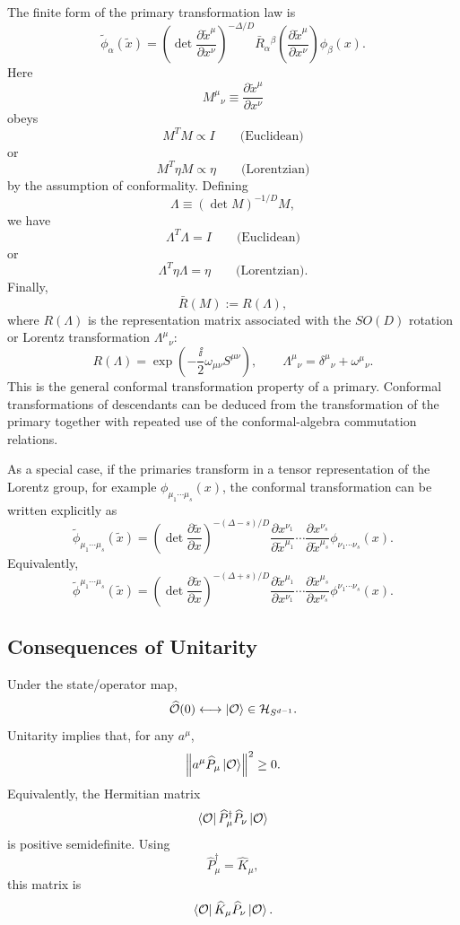 The finite form of the primary transformation law is
\[
  \widetilde\phi_\alpha(\widetilde x)
  =
  \left(
    \det\frac{\partial\widetilde x^\mu}{\partial x^\nu}
  \right)^{-\Delta/D}
  \bar R_\alpha{}^\beta
  \left(
    \frac{\partial\widetilde x^\mu}{\partial x^\nu}
  \right)
  \phi_\beta(x).
\]
Here
\[
  M^\mu{}_\nu
  \equiv
  \frac{\partial\widetilde x^\mu}{\partial x^\nu}
\]
obeys
\[
  M^T M\propto I
  \qquad\text{(Euclidean)}
\]
or
\[
  M^T\eta M\propto \eta
  \qquad\text{(Lorentzian)}
\]
by the assumption of conformality.  Defining
\[
  \Lambda\equiv (\det M)^{-1/D}M,
\]
we have
\[
  \Lambda^T\Lambda=I
  \qquad\text{(Euclidean)}
\]
or
\[
  \Lambda^T\eta\Lambda=\eta
  \qquad\text{(Lorentzian)}.
\]
Finally,
\[
  \bar R(M):=R(\Lambda),
\]
where \(R(\Lambda)\) is the representation matrix associated with the
\(SO(D)\) rotation or Lorentz transformation \(\Lambda^\mu{}_\nu\):
\[
  R(\Lambda)
  =
  \exp\left(-\frac{\ii}{2}\omega_{\mu\nu}S^{\mu\nu}\right),
  \qquad
  \Lambda^\mu{}_\nu=\delta^\mu{}_\nu+\omega^\mu{}_\nu .
\]
This is the general conformal transformation property of a primary.
Conformal transformations of descendants can be deduced from the
transformation of the primary together with repeated use of the
conformal-algebra commutation relations.

As a special case, if the primaries transform in a tensor
representation of the Lorentz group, for example
\(\phi_{\mu_1\cdots\mu_s}(x)\), the conformal transformation can be
written explicitly as
\[
  \widetilde\phi_{\mu_1\cdots\mu_s}(\widetilde x)
  =
  \left(
    \det\frac{\partial\widetilde x}{\partial x}
  \right)^{-(\Delta-s)/D}
  \frac{\partial x^{\nu_1}}{\partial\widetilde x^{\mu_1}}
  \cdots
  \frac{\partial x^{\nu_s}}{\partial\widetilde x^{\mu_s}}
  \phi_{\nu_1\cdots\nu_s}(x).
\]
Equivalently,
\[
  \widetilde\phi^{\mu_1\cdots\mu_s}(\widetilde x)
  =
  \left(
    \det\frac{\partial\widetilde x}{\partial x}
  \right)^{-(\Delta+s)/D}
  \frac{\partial\widetilde x^{\mu_1}}{\partial x^{\nu_1}}
  \cdots
  \frac{\partial\widetilde x^{\mu_s}}{\partial x^{\nu_s}}
  \phi^{\nu_1\cdots\nu_s}(x).
\]

\subsection{Consequences of Unitarity}

Under the state/operator map,
\[
  \widehat{\mathcal O}(0)
  \longleftrightarrow
  \ket{\mathcal O}\in\mathcal H_{S^{d-1}}.
\]
Unitarity implies that, for any \(a^\mu\),
\[
  \norm{a^\mu\widehat P_\mu\ket{\mathcal O}}^2\ge 0.
\]
Equivalently, the Hermitian matrix
\[
  \bra{\mathcal O}\widehat P_\mu^\dagger\widehat P_\nu
  \ket{\mathcal O}
\]
is positive semidefinite.  Using
\[
  \widehat P_\mu^\dagger=\widehat K_\mu,
\]
this matrix is
\[
  \bra{\mathcal O}\widehat K_\mu\widehat P_\nu
  \ket{\mathcal O}.
\]

